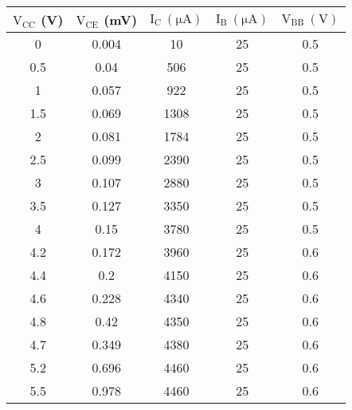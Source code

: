 \documentclass[12pt]{article}
\begin{document}
\begin{table}[H]
    \centering
    \begin{tabular}{|c|c|c|c|c|}
    \hline
       $\mathrm{V_{CC}}$ (V) & $\mathrm{V_{CE}}$ (mV) & $\mathrm{I_C \ (\mu A)}$ & $\mathrm{I_B \ (\mu A)}$ & $\mathrm{V_{BB} \ (V)}$ \\ \hline \hline
       0 & 0.004 & 10 & 25 & 0.5 \\ \hline
       0.5 & 0.04 & 506 & 25 & 0.5 \\ \hline
       1 & 0.057 & 922 & 25 & 0.5 \\ \hline
       1.5 & 0.069 & 1308 & 25 & 0.5 \\ \hline
       2 & 0.081 & 1784 & 25 & 0.5 \\ \hline
       2.5 & 0.099 & 2390 & 25 & 0.5 \\ \hline
       3 & 0.107 & 2880 & 25 & 0.5 \\ \hline
       3.5 & 0.127 & 3350 & 25 & 0.5 \\ \hline
       4 & 0.15 & 3780 & 25 & 0.5 \\ \hline
       4.2 & 0.172 & 3960 & 25 & 0.6 \\ \hline
       4.4 & 0.2 & 4150 & 25 & 0.6 \\ \hline
       4.6 & 0.228 & 4340 & 25 & 0.6 \\ \hline
       4.8 & 0.42 & 4350 & 25 & 0.6 \\ \hline
       4.7 & 0.349 & 4380 & 25 & 0.6 \\ \hline
       5.2 & 0.696 & 4460 &	25 & 0.6 \\ \hline
       5.5 & 0.978 & 4460 &	25 & 0.6 \\ \hline

    \end{tabular}
\end{table}
\end{document}
